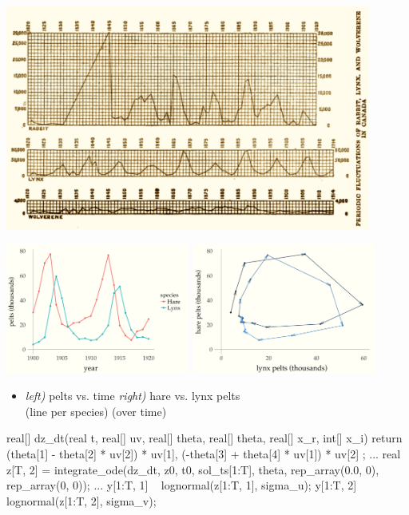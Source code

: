 \documentclass[11pt]{report}
\begin{document}
\begin{center}
\includegraphics[width=0.9\textwidth]{img/hudons-bay-data.png}
\end{center}

\begin{center}
\includegraphics[width=0.45\textwidth]{img/lynx-hares-1.png}~\includegraphics[width=0.45\textwidth]{img/lynx-hares-2.png}
\end{center}
\begin{itemize}
\item {\it left)} pelts vs. time \hfill
{\it right)} hare vs. lynx pelts
\\
(line per species) \hfill (over time)
\end{itemize}

\begin{stancode}
real[] dz_dt(real t, real[] uv, real[] theta,
             real[] theta, real[] x_r, int[] x_i) {
  return { (theta[1] - theta[2] * uv[2]) * uv[1],
           (-theta[3] + theta[4] * uv[1]) * uv[2] };
}
...
real z[T, 2]
  = integrate_ode(dz_dt, z0, t0, sol_ts[1:T], theta,
                  rep_array(0.0, 0), rep_array(0, 0));
...
y[1:T, 1] ~ lognormal(z[1:T, 1], sigma_u);
y[1:T, 2] ~ lognormal(z[1:T, 2], sigma_v);
\end{stancode}
\end{document}
